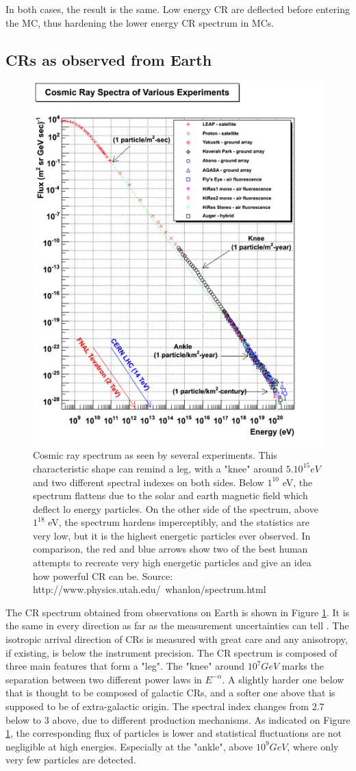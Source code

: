 
In both cases, the result is the same. Low energy CR are deflected before entering the MC, thus hardening the lower energy CR spectrum in MCs.



\subsection{CRs as observed from Earth}

\begin{figure}[h]
 \centering
 \includegraphics[width=.5\linewidth]{pic/theory/CR_spectrum.png}
 \caption[CR spectrum as observed on Earth.]{Cosmic ray spectrum as seen by several experiments. This characteristic shape can remind a leg, with a "knee" around $5.10^{15} eV$ and two different spectral indexes on both sides. Below $1^{10}$ eV, the spectrum flattens due to the solar and earth magnetic field which deflect lo energy particles. On the other side of the spectrum, above $1^{18}$ eV, the spectrum hardens imperceptibly, and the statistics are very low, but it is the highest energetic particles ever observed. In comparison, the red and blue arrows show two of the best human attempts to recreate very high energetic particles and give an idea how powerful CR can be. Source: http://www.physics.utah.edu/~whanlon/spectrum.html}
 \label{fig:CR_spectrum}
\end{figure}

The CR spectrum obtained from observations on Earth is shown in Figure \ref{fig:CR_spectrum}. It is the same in every direction as far as the measurement uncertainties can tell \cite{Hillas1984}. The isotropic arrival direction of CRs is measured with great care and any anisotropy, if existing, is below the instrument precision.
The CR spectrum is composed of three main features that form a "leg". The "knee" around $10^{7} GeV$ marks the separation between two different power laws in $E^{-\alpha}$. A slightly harder one below that is thought to be composed of galactic CRs, and a softer one above that is supposed to be of extra-galactic origin. The spectral index changes from 2.7 below to 3 above, due to different production mechanisms. \cite{Biermann1995}
As indicated on Figure \ref{fig:CR_spectrum}, the corresponding flux of particles is lower and statistical fluctuations are not negligible at high energies. Especially at the "ankle", above $10^9 GeV$, where only very few particles are detected.


